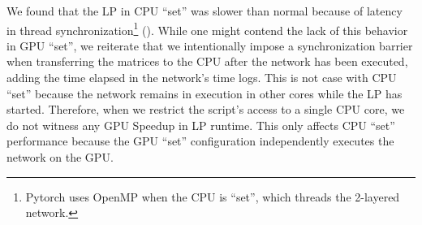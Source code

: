 We found that the LP in CPU ``set'' was slower than normal because of latency in thread synchronization\footnote{Pytorch uses OpenMP \cite{PTDocs,OpenMP} when the CPU is ``set'', which threads the 2-layered network.} (). While one might contend the lack of this behavior in GPU ``set'', we reiterate that we intentionally impose a synchronization barrier when transferring the matrices to the CPU after the network has been executed, adding the time elapsed in the network's time logs. This is not case with CPU ``set'' because the network remains in execution in other cores while the LP has started. Therefore, when we restrict the script's access to a single CPU core, we do not witness any GPU Speedup in LP runtime. This only affects CPU ``set'' performance because the GPU ``set'' configuration independently executes the network on the GPU.
